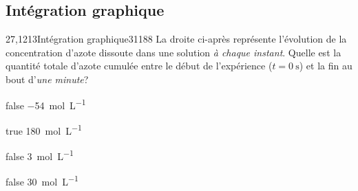 \documentclass[11pt]{article}
\begin{document}
        \subsection{Intégration graphique}
		\begin{question}{27,1213}{Intégration graphique}{3}{1188}
           La droite ci-après représente l'évolution de la concentration d'azote dissoute dans une solution \emph{à chaque instant}. Quelle est la quantité totale d'azote cumulée entre le début de l'expérience ($t=\SI{0}{\second}$) et la fin au bout d'\emph{une minute}?
            \begin{figure}
             \end{figure}
        \end{question}
        \begin{reponses}
            \item[false] \SI{-54}{\mol\per\liter}
		    \item[true] \SI{180}{\mol\per\liter}
		    \item[false] \SI{3}{\mol\per\liter}
		    \item[false] \SI{30}{\mol\per\liter}
		    \end{reponses}
        
\end{document}
